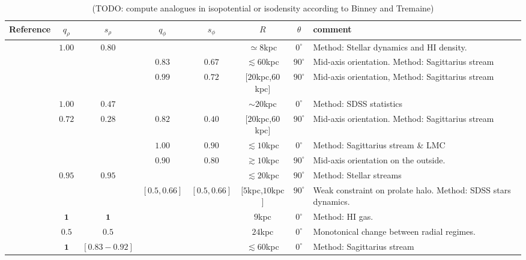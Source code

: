 \documentclass[a4paper,fleqn,usenatbib]{mnras}
\begin{document}
\begin{table}
\begin{tabular}{|l|cc|cc|c|c|p{4cm}|}\hline
Reference&$q_{\rho}$&$s_{\rho}$&$q_{\phi}$&$s_{\phi}$&$R$&$\theta$&comment\\ \hline \hline
\citet{Olling_and_Merrifield_2000}& $\mathbf{1.00}$ & $\mathbf{0.80}$ & & & $\simeq 8$kpc & $0^{\circ}$&Method: Stellar dynamics and HI density. \\\hline
\citet{Law_and_Majewski_2009}&&&$\mathbf{0.83}$&$\mathbf{0.67}$& $\lesssim 60$kpc&$90^{\circ}$&Mid-axis orientation. Method: Sagittarius stream\\\hline
%
\citet{Law_and_Majewski_2010}&&&$\mathbf{0.99}$&$\mathbf{0.72}$& $[20$kpc,$60$kpc$]$&$90^{\circ}$&Mid-axis orientation, Method: Sagittarius stream\\\hline
%
\citet{Loebman_et_al._2012}&$\mathbf{1.00}$&$\mathbf{0.47}$&&&$\sim 20$kpc &$0^{\circ}$&Method: SDSS statistics\\\hline
%
\citet{Deg_and_Widrow_2013}&$0.72$&$0.28$&$0.82$&$0.40$&$[20$kpc,$60$kpc$]$&$90^{\circ}$& Mid-axis orientation. Method: Sagittarius stream\\\hline
%
\multirow{2}{*}{\citet{Vera-Ciro_and_Helmi_2013}}&&&$\mathbf{1.00}$&$\mathbf{0.90}$&$\lesssim 10$kpc&$0^{\circ}$ & Method: Sagittarius stream \& LMC \\
&&&$\mathbf{0.90}$&$\mathbf{0.80}$&$\gtrsim 10$kpc&$90^{\circ}$& Mid-axis orientation on the outside. \\\hline
%
\citet{Bovy_et_el._2016}&$\mathbf{0.95}$&$\mathbf{0.95}$&&&$\lesssim 20$kpc&$90^{\circ}$ & Method: Stellar streams\\\hline
%
\citet{Bowden_et_al._2016}&&&$\mathbf{[0.5,0.66]}$&$\mathbf{[0.5,0.66]}$&$[5$kpc,$10$kpc$]$&$90^{\circ}$& Weak constraint on prolate halo. Method: SDSS stars dynamics.\\\hline
%
\multirow{2}{*}{\citet{Banerjee_and_Chanda_2011}}&$\mathbf{1}$&$\mathbf{1}$&&&$9$kpc&$0^{\circ}$&Method: HI gas. \\
&$\mathbf{0.5}$&$\mathbf{0.5}$&&&$24$kpc&$0^{\circ}$&Monotonical change between radial regimes.\\\hline
%
\cite{Johnston_et_al._2005}&$\mathbf{1}$&$\mathbf{[0.83-0.92]}$&&&$\lesssim 60$kpc&$0^{\circ}$&Method: Sagittarius stream\\\hline\hline
\end{tabular}
\caption{(TODO: compute analogues in isopotential or isodensity according to Binney and Tremaine)}
\end{table}
\end{document}
